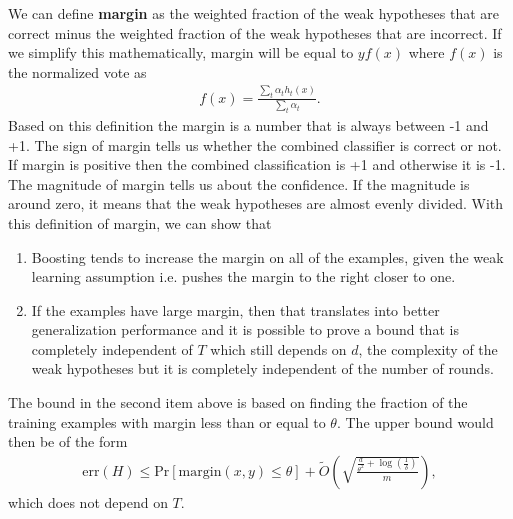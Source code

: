 \documentclass[10pt ]{article}
\begin{document}
We can define \textbf{margin} as the weighted fraction of the weak hypotheses that are correct minus the  weighted fraction of the weak hypotheses that are incorrect. If we simplify this mathematically, margin will be equal to  $y f(x)$ where $f(x)$ is the normalized vote as 
\begin{align}
f(x) =\frac{\sum_t \alpha_t h_t(x)}{\sum_t \alpha_t}.
\end{align}
Based on this definition the margin is a number that is always between -1 and +1. The sign of margin tells us whether the combined classifier is correct or not. If margin is positive then the combined classification is +1 and otherwise it is -1. The magnitude  of margin tells us about the confidence. If the magnitude is around zero, it means that the weak hypotheses are almost evenly divided. With this definition of margin, we can show that
\begin{enumerate}
\item Boosting tends to increase the margin on all of the examples, given the weak learning assumption i.e. pushes the margin to the right closer to one. 
\item If the examples have large margin, then that translates into better generalization performance and it is possible to prove a bound that is completely independent of $T$ which still depends on $d$, the complexity of the weak hypotheses but it is completely independent of the number of rounds.
\end{enumerate}
The bound in the second item above is based on finding the fraction of the training examples with margin less than or equal to $\theta$. The upper bound would then be of the form  
\begin{align}
\mathrm{err}(H) \le \mathrm{Pr}[\mathrm{margin}(x,y) \le \theta] + \tilde{O} \left( \sqrt{\frac{\frac{d}{\theta^2} + \log(\frac{1}{\delta})}{m}}\right),
\end{align}
which does not depend on $T$.


\end{document}

